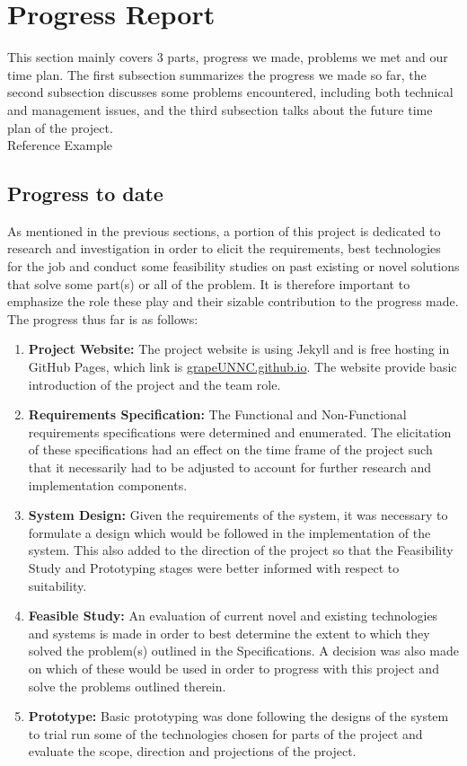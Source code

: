 \documentclass[paper=a4, fontsize=11pt,twoside]{scrartcl}		%
\begin{document}
\section{Progress Report}
This section mainly covers 3 parts, progress we made, problems we met and our time plan. The first subsection summarizes the progress we made so far, the second subsection discusses some problems encountered, including both technical and management issues, and the third subsection talks about the future time plan of the project. \\
Reference Example\cite{Debray:2000:CTC:349214.349233}

\subsection{Progress to date}
As mentioned in the previous sections, a portion of this project is dedicated to research and investigation in order to elicit the requirements, best technologies for the job and conduct some feasibility studies on past existing or novel solutions that solve some part(s) or all of the problem. It is therefore important to emphasize the role these play and their sizable contribution to the progress made. The progress thus far is as follows:
\begin{enumerate}
	\item \textbf{Project Website: } The project website is using Jekyll and is free hosting in GitHub Pages, which link is \url{grapeUNNC.github.io}. The website provide basic introduction of the project and the team role.
	\item \textbf{Requirements Specification: }The Functional and Non-Functional requirements specifications were determined and enumerated. The elicitation of these specifications had an effect on the time frame of the project such that it necessarily had to be adjusted to account for further research and implementation components.
	\item \textbf{System Design: }Given the requirements of the system, it was necessary to formulate a design which would be followed in the implementation of the system. This also added to the direction of the project so that the Feasibility Study and Prototyping stages were better informed with respect to suitability.
	\item \textbf{Feasible Study: }An evaluation of current novel and existing technologies and systems is made in order to best determine the extent to which they solved the problem(s) outlined in the Specifications. A decision was also made on which of these would be used in order to progress with this project and solve the problems outlined therein.
	\item \textbf{Prototype: }Basic prototyping was done following the designs of the system to trial run some of the technologies chosen for parts of the project and evaluate the scope, direction and projections of the project.
\end{enumerate}
\end{document}
